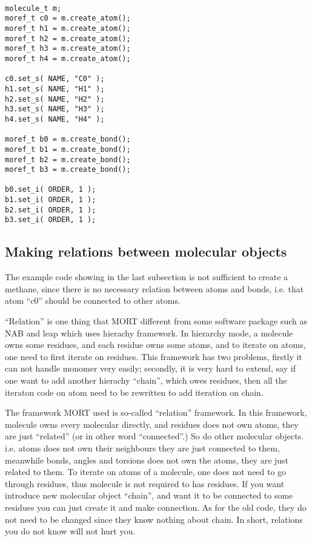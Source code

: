 \documentclass[letterpaper]{book}
\begin{document}
\begin{lstlisting}

molecule_t m;
moref_t c0 = m.create_atom();
moref_t h1 = m.create_atom();
moref_t h2 = m.create_atom();
moref_t h3 = m.create_atom();
moref_t h4 = m.create_atom();

c0.set_s( NAME, "C0" );
h1.set_s( NAME, "H1" );
h2.set_s( NAME, "H2" );
h3.set_s( NAME, "H3" );
h4.set_s( NAME, "H4" );

moref_t b0 = m.create_bond();
moref_t b1 = m.create_bond();
moref_t b2 = m.create_bond();
moref_t b3 = m.create_bond();

b0.set_i( ORDER, 1 );
b1.set_i( ORDER, 1 );
b2.set_i( ORDER, 1 );
b3.set_i( ORDER, 1 );

\end{lstlisting}

\subsection{Making relations between molecular objects}

  The example code showing in the last subsection is not sufficient to create a methane,
since there is no necessary relation between atoms and bonds, i.e. that atom ``c0'' should
be connected to other atoms. 

  ``Relation'' is one thing that MORT different from some software package such as NAB and leap
which uses hierachy framework. In hierarchy mode, a molecule owns some residues, and each residue 
owns some atoms, and to iterate on atoms, one need to first iterate on residues. This
framework has two problems, firstly it can not handle monomer very easily; secondly, 
it is very hard to extend, say if one want to add another hierachy ``chain'', which 
owes residues, then all the iteraton code on atom need to be rewritten to add iteration
on chain.

  The framework MORT used is so-called ``relation'' framework. In this framework, molecule owns
every molecular directly, and residues does not own atoms, they are just ``related'' (or in
other word ``connected''.) So do other molecular objects. i.e. atoms does not own their
neighbours they are just connected to them, meanwhile bonds, angles and torsions does not
own the atoms, they are just related to them. To iterate on atoms of a molecule, one does
not need to go through residues, thus molecule is not required to has residues. If you
want introduce new molecular object ``chain'', and want it to be connected to some residues
you can just create it and make connection. As for the old code, they do not need to
be changed since they know nothing about chain. In short, relations you do not know will
not hurt you. 
\end{document}
